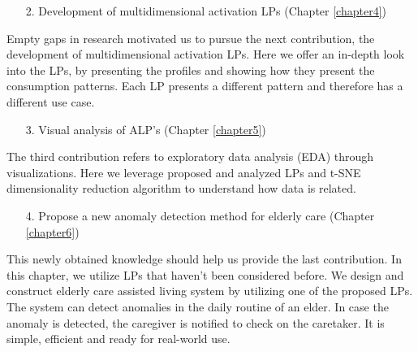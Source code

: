 \begin{enumerate}
	\item[2.] Development of multidimensional activation LPs (Chapter \ref{chapter4})
\end{enumerate}
Empty gaps in research motivated us to pursue the next contribution, 
the development of multidimensional activation LPs. 
Here we offer an in-depth look into the LPs, by presenting the profiles and showing how they present the consumption patterns.
Each LP presents a different pattern and therefore has a different use case. 

\begin{enumerate}
	\item[3.] Visual analysis of ALP's (Chapter \ref{chapter5})
\end{enumerate}
The third contribution refers to exploratory data analysis (EDA) through visualizations.
Here we leverage proposed and analyzed LPs and t-SNE dimensionality reduction algorithm to understand how data is related.

\begin{enumerate}
	\item[4.] Propose a new anomaly detection method for elderly care (Chapter \ref{chapter6})
\end{enumerate}

This newly obtained knowledge should help us provide the last contribution.
In this chapter, we utilize LPs that haven't been considered before.
We design and construct elderly care assisted living system by utilizing one of the proposed LPs.
The system can detect anomalies in the daily routine of an elder.
In case the anomaly is detected, the caregiver is notified to check on the caretaker. 
It is simple, efficient and ready for real-world use.

